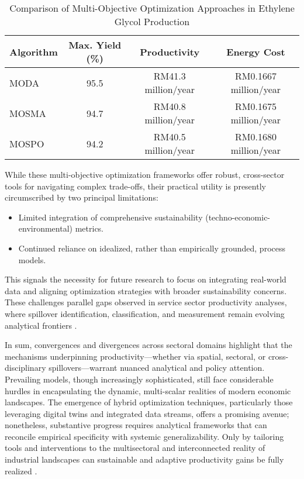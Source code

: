 \begin{table*}[htbp]
\centering
\caption{Comparison of Multi-Objective Optimization Approaches in Ethylene Glycol Production}
\label{tab:ethylene_glycol_optimization}
\begin{adjustbox}{max width=\textwidth}
\begin{tabular}{lccc}
\toprule
\textbf{Algorithm} & \textbf{Max. Yield (\%)} & \textbf{Productivity} & \textbf{Energy Cost} \\
\midrule
MODA  & 95.5 & RM41.3 million/year & RM0.1667 million/year \\
MOSMA & 94.7 & RM40.8 million/year & RM0.1675 million/year \\
MOSPO & 94.2 & RM40.5 million/year & RM0.1680 million/year \\
\bottomrule
\end{tabular}
\end{adjustbox}
\end{table*}

While these multi-objective optimization frameworks offer robust, cross-sector tools for navigating complex trade-offs, their practical utility is presently circumscribed by two principal limitations:
\begin{itemize}
    \item Limited integration of comprehensive sustainability (techno-economic-environmental) metrics.
    \item Continued reliance on idealized, rather than empirically grounded, process models.
\end{itemize}
This signals the necessity for future research to focus on integrating real-world data and aligning optimization strategies with broader sustainability concerns. These challenges parallel gaps observed in service sector productivity analyses, where spillover identification, classification, and measurement remain evolving analytical frontiers \cite{ref75}.

In sum, convergences and divergences across sectoral domains highlight that the mechanisms underpinning productivity—whether via spatial, sectoral, or cross-disciplinary spillovers—warrant nuanced analytical and policy attention. Prevailing models, though increasingly sophisticated, still face considerable hurdles in encapsulating the dynamic, multi-scalar realities of modern economic landscapes. The emergence of hybrid optimization techniques, particularly those leveraging digital twins and integrated data streams, offers a promising avenue; nonetheless, substantive progress requires analytical frameworks that can reconcile empirical specificity with systemic generalizability. Only by tailoring tools and interventions to the multisectoral and interconnected reality of industrial landscapes can sustainable and adaptive productivity gains be fully realized \cite{ref74}\cite{ref75}\cite{ref88}.

